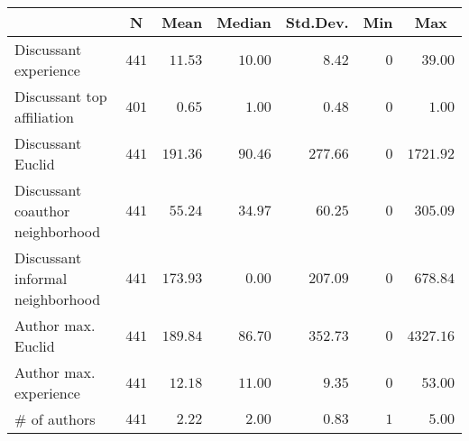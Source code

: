 \begin{center}
\begin{tabular}{lrrrrrr}
\toprule
\multicolumn{1}{l}{}&\multicolumn{1}{c}{N}&\multicolumn{1}{c}{Mean}&\multicolumn{1}{c}{Median}&\multicolumn{1}{c}{Std.Dev.}&\multicolumn{1}{c}{Min}&\multicolumn{1}{c}{Max}\tabularnewline
\midrule
Discussant experience&$441$&$ 11.53$&$10.00$&$  8.42$&$0$&$  39.00$\tabularnewline
Discussant top affiliation&$401$&$  0.65$&$ 1.00$&$  0.48$&$0$&$   1.00$\tabularnewline
Discussant Euclid&$441$&$191.36$&$90.46$&$277.66$&$0$&$1721.92$\tabularnewline
Discussant coauthor neighborhood&$441$&$ 55.24$&$34.97$&$ 60.25$&$0$&$ 305.09$\tabularnewline
Discussant informal neighborhood&$441$&$173.93$&$ 0.00$&$207.09$&$0$&$ 678.84$\tabularnewline
Author max. Euclid&$441$&$189.84$&$86.70$&$352.73$&$0$&$4327.16$\tabularnewline
Author max. experience&$441$&$ 12.18$&$11.00$&$  9.35$&$0$&$  53.00$\tabularnewline
\# of authors&$441$&$  2.22$&$ 2.00$&$  0.83$&$1$&$   5.00$\tabularnewline
\bottomrule
\end{tabular}\end{center}
